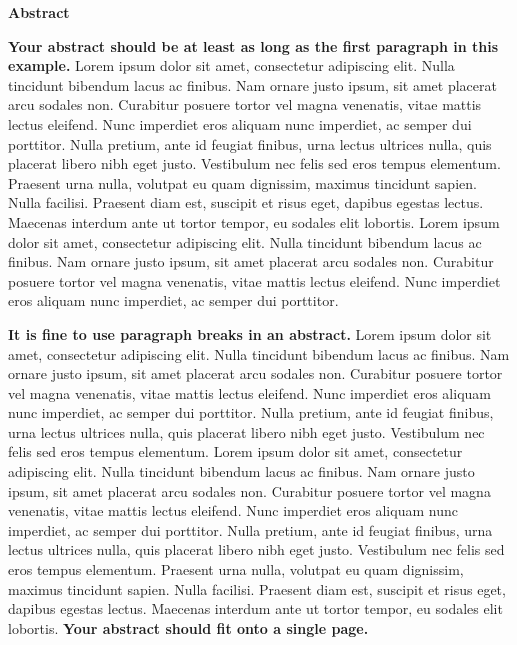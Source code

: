 \begin{center}

\vspace*{2cm} %
        
{\large\textbf{Abstract}}
        
\vspace{1cm} %
\end{center}


{\bf Your abstract should be at least as long as the first paragraph in this example.} Lorem ipsum dolor sit amet, consectetur adipiscing elit. Nulla tincidunt bibendum lacus ac finibus. Nam ornare justo ipsum, sit amet placerat arcu sodales non. Curabitur posuere tortor vel magna venenatis, vitae mattis lectus eleifend. Nunc imperdiet eros aliquam nunc imperdiet, ac semper dui porttitor. Nulla pretium, ante id feugiat finibus, urna lectus ultrices nulla, quis placerat libero nibh eget justo. Vestibulum nec felis sed eros tempus elementum. Praesent urna nulla, volutpat eu quam dignissim, maximus tincidunt sapien. Nulla facilisi. Praesent diam est, suscipit et risus eget, dapibus egestas lectus. Maecenas interdum ante ut tortor tempor, eu sodales elit lobortis.
Lorem ipsum dolor sit amet, consectetur adipiscing elit. Nulla tincidunt bibendum lacus ac finibus. Nam ornare justo ipsum, sit amet placerat arcu sodales non. Curabitur posuere tortor vel magna venenatis, vitae mattis lectus eleifend. Nunc imperdiet eros aliquam nunc imperdiet, ac semper dui porttitor. 

{\bf It is fine to use paragraph breaks in an abstract.} Lorem ipsum dolor sit amet, consectetur adipiscing elit. Nulla tincidunt bibendum lacus ac finibus. Nam ornare justo ipsum, sit amet placerat arcu sodales non. Curabitur posuere tortor vel magna venenatis, vitae mattis lectus eleifend. Nunc imperdiet eros aliquam nunc imperdiet, ac semper dui porttitor. Nulla pretium, ante id feugiat finibus, urna lectus ultrices nulla, quis placerat libero nibh eget justo. Vestibulum nec felis sed eros tempus elementum. 
Lorem ipsum dolor sit amet, consectetur adipiscing elit. Nulla tincidunt bibendum lacus ac finibus. Nam ornare justo ipsum, sit amet placerat arcu sodales non. Curabitur posuere tortor vel magna venenatis, vitae mattis lectus eleifend. Nunc imperdiet eros aliquam nunc imperdiet, ac semper dui porttitor. Nulla pretium, ante id feugiat finibus, urna lectus ultrices nulla, quis placerat libero nibh eget justo. Vestibulum nec felis sed eros tempus elementum. Praesent urna nulla, volutpat eu quam dignissim, maximus tincidunt sapien. Nulla facilisi. Praesent diam est, suscipit et risus eget, dapibus egestas lectus. Maecenas interdum ante ut tortor tempor, eu sodales elit lobortis. {\bf Your abstract should fit onto a single page.}